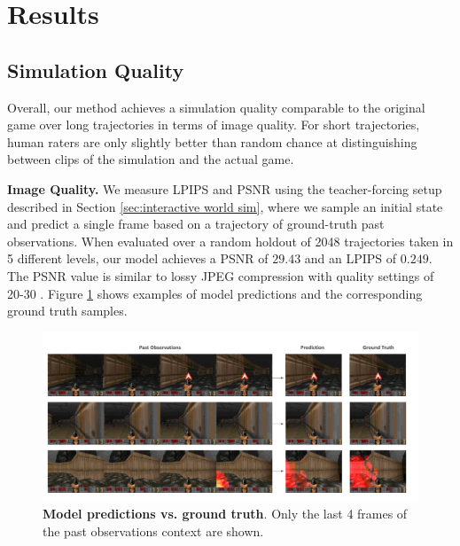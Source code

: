\documentclass{article} %
\begin{document}
\section{Results}
\label{sec:results}

\subsection{Simulation Quality}
\label{sec:sim quality}

Overall, our method achieves a simulation quality comparable to the original game over long trajectories in terms of image quality. For short trajectories, human raters are only slightly better than random chance at distinguishing between clips of the simulation and the actual game.

\textbf{Image Quality.} We measure LPIPS \citep{zhang2018perceptual} and PSNR using the teacher-forcing setup described in Section \ref{sec:interactive world sim}, where we sample an initial state and predict a single frame based on a trajectory of ground-truth past observations.
When evaluated over a random holdout of 2048 trajectories taken in 5 different levels, our model achieves a PSNR of $29.43$ and an LPIPS of $0.249$. %
The PSNR value is similar to lossy JPEG compression with quality settings of 20-30 \citep{petric2018comparisoncsjpegterms}.
Figure \ref{fig:predcition_samples} shows examples of model predictions and the corresponding ground truth samples.

\begin{figure}[t]
    \centering
    \includegraphics[width=1.0\textwidth]{figures/image_quality.pdf}
    \caption{\textbf{Model predictions vs. ground truth}. Only the last 4 frames of the past observations context are shown.}
    \label{fig:predcition_samples}
\end{figure}
\end{document}
